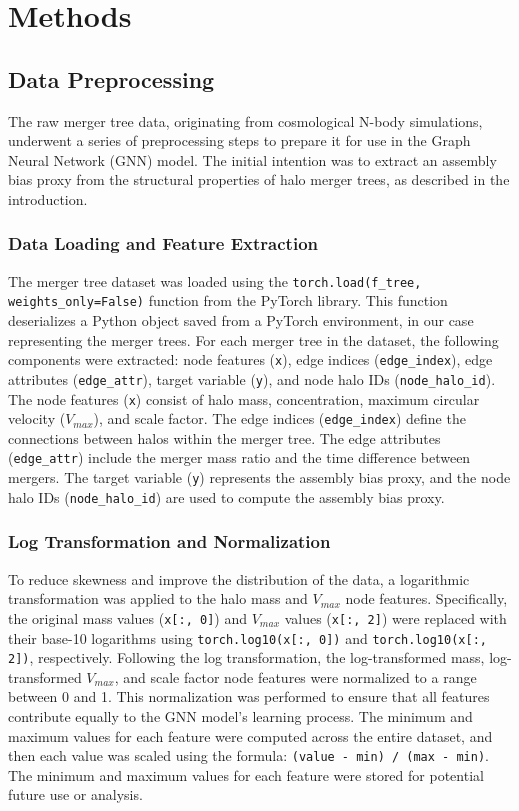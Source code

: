 \documentclass[twocolumn]{aastex631}
\begin{document}
\section{Methods}
\label{sec:methods}
\subsection{Data Preprocessing}

The raw merger tree data, originating from cosmological N-body simulations, underwent a series of preprocessing steps to prepare it for use in the Graph Neural Network (GNN) model. The initial intention was to extract an assembly bias proxy from the structural properties of halo merger trees, as described in the introduction.

\subsubsection{Data Loading and Feature Extraction}
The merger tree dataset was loaded using the \texttt{torch.load(f\_tree, weights\_only=False)} function from the PyTorch library. This function deserializes a Python object saved from a PyTorch environment, in our case representing the merger trees. For each merger tree in the dataset, the following components were extracted: node features (\texttt{x}), edge indices (\texttt{edge\_index}), edge attributes (\texttt{edge\_attr}), target variable (\texttt{y}), and node halo IDs (\texttt{node\_halo\_id}). The node features (\texttt{x}) consist of halo mass, concentration, maximum circular velocity ($V_{max}$), and scale factor. The edge indices (\texttt{edge\_index}) define the connections between halos within the merger tree. The edge attributes (\texttt{edge\_attr}) include the merger mass ratio and the time difference between mergers. The target variable (\texttt{y}) represents the assembly bias proxy, and the node halo IDs (\texttt{node\_halo\_id}) are used to compute the assembly bias proxy.

\subsubsection{Log Transformation and Normalization}
To reduce skewness and improve the distribution of the data, a logarithmic transformation was applied to the halo mass and $V_{max}$ node features. Specifically, the original mass values (\texttt{x[:, 0]}) and $V_{max}$ values (\texttt{x[:, 2]}) were replaced with their base-10 logarithms using \texttt{torch.log10(x[:, 0])} and \texttt{torch.log10(x[:, 2])}, respectively. Following the log transformation, the log-transformed mass, log-transformed $V_{max}$, and scale factor node features were normalized to a range between 0 and 1. This normalization was performed to ensure that all features contribute equally to the GNN model's learning process. The minimum and maximum values for each feature were computed across the entire dataset, and then each value was scaled using the formula: \texttt{(value - min) / (max - min)}. The minimum and maximum values for each feature were stored for potential future use or analysis.
\end{document}
